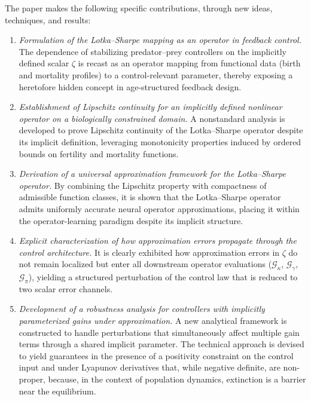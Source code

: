 \documentclass[journal,twoside,web]{ieeecolor}
\begin{document}
The paper makes the following specific contributions, through new ideas, techniques, and results:
\begin{enumerate}
\item \emph{Formulation of the Lotka–Sharpe mapping as an operator in feedback control.} The dependence of stabilizing predator–prey controllers on the implicitly defined scalar $\zeta$ is recast as an operator mapping from functional data (birth and mortality profiles) to a control-relevant parameter, thereby exposing a heretofore hidden concept in age-structured feedback design.
\item \emph{Establishment of Lipschitz continuity for an implicitly defined nonlinear operator on a biologically constrained domain.} A nonstandard analysis is developed to prove Lipschitz continuity of the Lotka–Sharpe operator despite its implicit definition, leveraging monotonicity properties induced by ordered bounds on fertility and mortality functions.
\item \emph{Derivation of a universal approximation framework for the Lotka–Sharpe operator.} By combining the Lipschitz property with compactness of admissible function classes, it is shown that the Lotka–Sharpe operator admits uniformly accurate neural operator approximations, placing it within the operator-learning paradigm despite its implicit structure.
\item \emph{Explicit characterization of how approximation errors propagate through the control architecture.} It is clearly exhibited how approximation errors in $\zeta$ do not remain localized but enter all downstream operator evaluations ($\mathcal{G}_\kappa$, $\mathcal{G}_\gamma$, $\mathcal{G}_\pi$), yielding a structured perturbation of the control law that is reduced to two scalar error channels.
\item \emph{Development of a robustness analysis for controllers with implicitly parameterized gains under approximation.} A new analytical framework is constructed to handle perturbations that simultaneously affect multiple gain terms through a shared implicit parameter. The technical approach is devised to yield guarantees in the presence of a positivity constraint on the control input and under Lyapunov derivatives that,  while negative definite, are non-proper, because, in the context of population dynamics,  extinction is a barrier near the equilibrium.
\end{enumerate}
\end{document}
